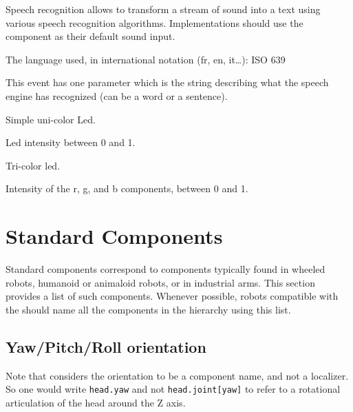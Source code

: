 
Speech recognition allows to transform a stream of sound into a text
using various speech recognition algorithms. Implementations
should use the  component as their default sound input.

\begin{slots}
  {%
    The language used, in international notation (fr, en, it…): ISO
    639%
  }
\end{slots}

\begin{events}
  {%
    This event has one parameter which is the string describing what
    the speech engine has recognized (can be a word or a sentence).%
  }
\end{events}


Simple uni-color Led.

\begin{slots}
  {%
    Led intensity between 0 and 1.%
  }
\end{slots}



Tri-color led.

\begin{slots}
  {%
    Intensity of the r, g, and b components, between 0 and 1.%
  }
\end{slots}

\section{Standard Components}

Standard components correspond to components typically found in wheeled
robots, humanoid or animaloid robots, or in industrial arms. This section
provides a list of such components. Whenever possible, robots compatible with
the \gsrapi should name all the components in the hierarchy using this list.

\subsection{Yaw/Pitch/Roll orientation}
\label{sec:naming:ypr}

Note that \gsrapi considers the orientation to be a component name, and
not a localizer. So one would write \lstinline|head.yaw| and not
\lstinline|head.joint[yaw]| to refer to a rotational articulation of the head
around the Z axis.

